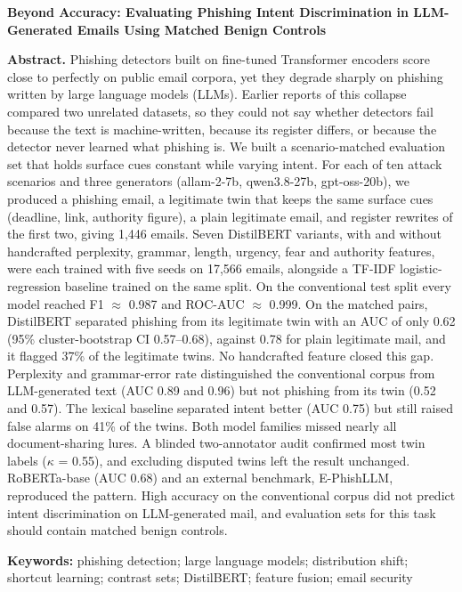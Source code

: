 \documentclass[11pt,letterpaper]{article}
\begin{document}
\begin{center}
{\fontsize{17}{21}\selectfont\bfseries Beyond Accuracy: Evaluating Phishing Intent Discrimination in LLM-Generated Emails Using Matched Benign Controls\par}
\vspace{12pt}
{\fontsize{12}{14}\selectfont {}\par}
\end{center}
\vspace{6pt}
\begin{list}{}{\leftmargin=0.35in\rightmargin=0.35in}\small\item[]
\textbf{Abstract.} Phishing detectors built on fine-tuned Transformer encoders score close to perfectly on public email corpora, yet they degrade sharply on phishing written by large language models (LLMs). Earlier reports of this collapse compared two unrelated datasets, so they could not say whether detectors fail because the text is machine-written, because its register differs, or because the detector never learned what phishing is. We built a scenario-matched evaluation set that holds surface cues constant while varying intent. For each of ten attack scenarios and three generators (allam-2-7b, qwen3.8-27b, gpt-oss-20b), we produced a phishing email, a legitimate twin that keeps the same surface cues (deadline, link, authority figure), a plain legitimate email, and register rewrites of the first two, giving 1,446 emails. Seven DistilBERT variants, with and without handcrafted perplexity, grammar, length, urgency, fear and authority features, were each trained with five seeds on 17,566 emails, alongside a TF-IDF logistic-regression baseline trained on the same split. On the conventional test split every model reached F1 $\approx$ 0.987 and ROC-AUC $\approx$ 0.999. On the matched pairs, DistilBERT separated phishing from its legitimate twin with an AUC of only 0.62 (95\% cluster-bootstrap CI 0.57--0.68), against 0.78 for plain legitimate mail, and it flagged 37\% of the legitimate twins. No handcrafted feature closed this gap. Perplexity and grammar-error rate distinguished the conventional corpus from LLM-generated text (AUC 0.89 and 0.96) but not phishing from its twin (0.52 and 0.57). The lexical baseline separated intent better (AUC 0.75) but still raised false alarms on 41\% of the twins. Both model families missed nearly all document-sharing lures. A blinded two-annotator audit confirmed most twin labels ($\kappa$ = 0.55), and excluding disputed twins left the result unchanged. RoBERTa-base (AUC 0.68) and an external benchmark, E-PhishLLM, reproduced the pattern. High accuracy on the conventional corpus did not predict intent discrimination on LLM-generated mail, and evaluation sets for this task should contain matched benign controls.

\textbf{Keywords:} phishing detection; large language models; distribution shift; shortcut learning; contrast sets; DistilBERT; feature fusion; email security
\end{list}
\vspace{4pt}
\end{document}

